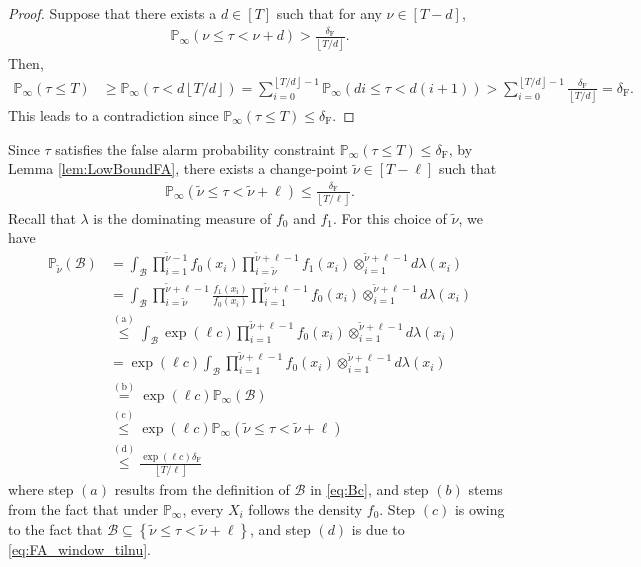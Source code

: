 \documentclass[12pt]{interact}
\newcommand{\tilnu}{\tilde{\nu}}
\newcommand{\aaaa}{\mathrm{(a)}}
\newcommand{\bbbb}{\mathrm{(b)}}
\newcommand{\cccc}{\mathrm{(c)}}
\newcommand{\dddd}{\mathrm{(d)}}
\newcommand{\lp}{\left(}
\newcommand{\rp}{\right)}
\newcommand{\lb}{\left[}
\newcommand{\rb}{\right]}
\newcommand{\lbp}{\left\{}
\newcommand{\rbp}{\right\}}
\newcommand{\mcal}{\mathcal}
\newcommand{\lfl}{\left\lfloor}
\newcommand{\rfl}{\right\rfloor}
\renewcommand{\Pr}{\mathbb{P}}
\theoremstyle{plain}
\begin{document}
\begin{proof}
Suppose that there exists a $d \in \lb T\rb$ such that for any $\nu\in\lb T-d\rb$,
%
\begin{align}
\Pr_{\infty}\lp\nu\leq\tau<\nu+d\rp>\frac{\delta_{\mathrm{F}}}{\lfl T/d\rfl}.
\end{align}
%
Then,
%
\begin{align}
\Pr_{\infty}\lp\tau\leq T\rp
&\geq\Pr_{\infty}\lp\tau< d\lfl T/d\rfl\rp
=\!\!\sum_{i=0}^{\lfl T/d\rfl-1}\!\!\Pr_{\infty}\lp d i\leq\tau
<d\lp i+1\rp\rp>\!\!\sum_{i=0}^{\lfl T/d \rfl-1}\!\!\frac{\delta_{\mathrm{F}}}{\lfl T/d \rfl}
=\delta_{\mathrm{F}}.
\end{align}
%
This leads to a contradiction since $\Pr_{\infty}\lp\tau\leq T\rp\leq\delta_{\mathrm{F}}$.
\end{proof}

Since $\tau$ satisfies the false alarm probability constraint $\Pr_{\infty}\lp\tau\leq T\rp\leq\delta_{\mathrm{F}}$, by Lemma \ref{lem:LowBoundFA}, there exists a change-point $\tilnu \in\lb T-\ell\rb$ such that
%
\begin{align}
    \Pr_{\infty}\lp\tilnu\leq\tau < \tilnu+\ell\rp\leq\frac{\delta_{\mathrm{F}}}{\lfl T/\ell\rfl}.\label{eq:FA_window_tilnu}
\end{align}
%
Recall that $\lambda$ is the dominating measure of $f_{0}$ and $f_{1}$. For this choice of $\tilnu$, we have
\begin{align}\nonumber
\Pr_{\tilnu}\lp\mcal{B}\rp&=\int_{\mcal{B}}\prod_{i=1}^{\tilnu-1}f_{0}\lp x_{i}\rp\prod_{i=\tilnu}^{\tilnu+\ell-1}f_{1}\lp x_{i}\rp\otimes_{i=1}^{\tilnu+\ell-1} d \lambda\lp x_{i}\rp\\\nonumber  &=\int_{\mcal{B}}\prod_{i=\tilnu}^{\tilnu+\ell-1}\frac{f_{1}\lp x_{i}\rp}{f_{0}\lp x_{i}\rp}\prod_{i=1}^{\tilnu+\ell-1}f_{0}\lp x_{i}\rp\otimes_{i=1}^{\tilnu+\ell-1} d \lambda\lp x_{i}\rp\\\nonumber
&\overset{\aaaa}{\leq}\int_{\mcal{B}}\exp\lp \ell c\rp\prod_{i=1}^{\tilnu+\ell-1}f_{0}\lp x_{i}\rp\otimes_{i=1}^{\tilnu+\ell-1} d \lambda\lp x_{i}\rp\\\nonumber
&=\exp\lp \ell c\rp\int_{\mcal{B}}\prod_{i=1}^{\tilnu+\ell-1}f_{0}\lp x_{i}\rp\otimes_{i=1}^{\tilnu+\ell-1} d \lambda\lp x_{i}\rp\\\nonumber
&\overset{\bbbb}{=}\exp\lp \ell c\rp\Pr_{\infty}\lp\mcal{B}\rp\\\nonumber
&\overset{\cccc}{\leq}\exp\lp \ell c\rp\Pr_{\infty}\lp\tilnu\leq\tau<\tilnu+\ell\rp\\
&\overset{\dddd}{\leq}\frac{\exp\lp \ell c\rp\delta_{\mathrm{F}}}{\lfl T/\ell\rfl}\label{eq:thm_1_sketch_2}
\end{align}
%
where step $(a)$ results from the definition of $\mcal{B}$ in \eqref{eq:Bc}, and step $(b)$ stems from the fact that under $\Pr_{\infty}$, every $X_{i}$ follows the density $f_{0}$. Step $(c)$ is owing to the fact that $\mcal{B}\subseteq\lbp\tilnu\leq\tau<\tilnu+\ell\rbp$, and step $(d)$ is due to \eqref{eq:FA_window_tilnu}.
\end{document}

